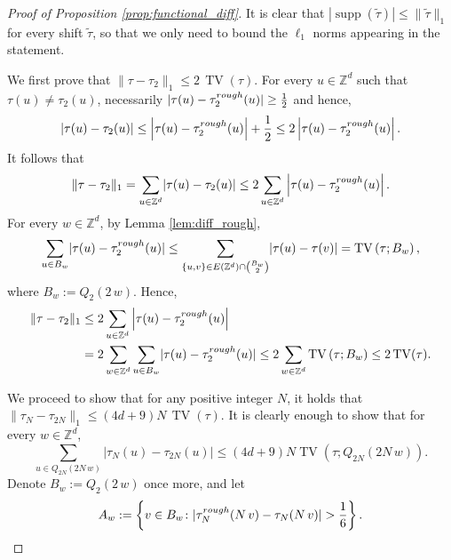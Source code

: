 \documentclass[10pt,a4paper]{amsart}
\DeclareMathOperator{\TV}{TV}
\DeclareMathOperator{\supp}{supp}
\newcommand{\Z}{\mathbb{Z}}
\begin{document}
\begin{proof}[Proof of Proposition \ref{prop:functional_diff}]

It is clear that $|\supp(\tilde{\tau})|\le \|\tilde{\tau}\|_1$ for every shift $\tilde{\tau}$, so that we only need to bound the $\ell_1$ norms appearing in the statement.

We first prove that $\lVert \tau-\tau_2\rVert_1
\leq 2\, \TV(\tau)$. 
For every $u\in\Z^d$ such that $\tau(u)\neq\tau_2(u)$, necessarily $\lvert \tau(u)-\tau^{\rm rough}_2(u)\rvert\geq\frac{1}{2}$ and hence, 
$$
\left\lvert\tau(u)-\tau_2(u)\right\rvert\leq \left\lvert\tau(u)-\tau^{\rm rough}_2(u)\right\rvert+\frac{1}{2}\leq 2\left\lvert\tau(u)-\tau^{\rm rough}_2(u)\right\rvert.$$
It follows that 
$$ 
\lVert \tau-\tau_2\rVert_1=\sum_{u\in\Z^d}\lvert\tau(u)-\tau_2(u)\rvert\leq 2\sum_{u\in\Z^d}\left\lvert\tau(u)-\tau^{\rm rough}_2(u)\right\rvert.
$$
For every $w\in\Z^d$, by Lemma \ref{lem:diff_rough}, 
$$
\sum_{u\in B_w}\lvert\tau(u)-\tau^{\rm rough}_2(u)\rvert\leq \sum_{\{u,v\}\in E(\Z^d)\cap\binom{B_w}{2}}\lvert\tau(u)-\tau(v)\rvert=\TV\left(\tau;B_w\right),
$$
where $B_w:=Q_2(2\,w)$.
Hence,
\begin{align*} 
\lVert \tau-\tau_2\rVert_1&\leq 2\sum_{u\in\Z^d}\left\lvert\tau(u)-\tau^{\rm rough}_2(u)\right\rvert\\&=2\sum_{w\in\Z^d}\sum_{u\in B_w}\lvert\tau(u)-\tau^{\rm rough}_2(u)\rvert
\leq 2\sum_{w\in\Z^d}\TV\left(\tau;B_w\right)\leq 2\TV(\tau).
\end{align*}

We proceed to show that for any positive integer $N$, it holds that $\lVert \tau_N-\tau_{2N}\rVert_1
\leq (4d+9)N\, \TV(\tau)$.
It is clearly enough to show that for every $w\in \mathbb Z^d$, 
$$
\sum_{u\in Q_{2N}(2N\,w)} \lvert \tau_N(u) -\tau_{2N} (u) \rvert\leq (4d+9)N \TV\left(\tau;Q_{2N}(2N\,w)\right).
$$
Denote $B_w:=Q_2(2\,w)$ once more, and let 
$$A_w:=\left\{v\in B_w\colon \lvert\tau^{\rm rough}_N(N\,v)-\tau_N(N\,v)\rvert>\frac{1}{6}\right\}.$$


\end{proof}
\end{document}
